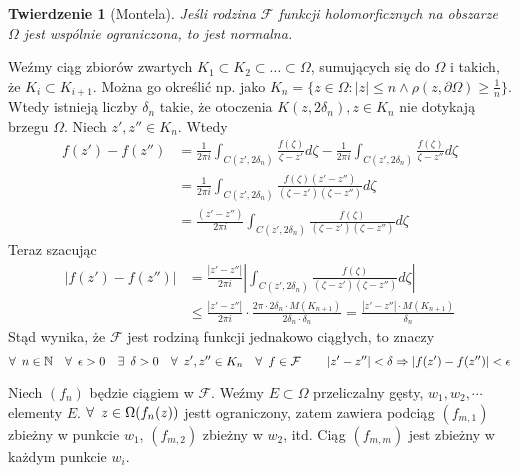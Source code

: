 \documentclass[11pt]{article}
\newcommand{\abs}[1]{\left|#1\right|} %
\theoremstyle{plain}
\newtheorem*{theorem}{Twierdzenie}
\theoremstyle{definition}
\theoremstyle{remark}
\let\oldendproof\endproof
\renewenvironment{proof}[1][\proofname]{
  \oldproof[\textsc{\small #1}]
}{\oldendproof}
\begin{document}
\begin{theorem}[Montela]
  Jeśli rodzina $ \mathcal{F} $ funkcji holomorficznych na obszarze $ \Omega $ jest wspólnie ograniczona, to jest normalna.
\end{theorem}


\begin{proof}
  Weźmy ciąg zbiorów zwartych $ K_1 \subset K_2 \subset \dots \subset \Omega $, sumujących się do $ \Omega $ i takich, że $ K_i \subset K_{i+1} $.
  Można go określić np. jako $ K_n = \{ z \in \Omega: \abs{z} \leq n \wedge \rho(z, \partial\Omega) \geq \frac{1}{n} \} $.
  Wtedy istnieją liczby $ \delta_n $ takie, że otoczenia $ K(z, 2\delta_n), z \in K_n $ nie dotykają brzegu $ \Omega $.
  Niech $ z', z'' \in K_n $.
  Wtedy
  \begin{align*}
    f(z') - f(z'') &
    = \frac{1}{2 \pi i} \int_{C(z', 2\delta_n)} \frac{f(\zeta)}{\zeta-z'} d\zeta - \frac{1}{2 \pi i} \int_{C(z', 2\delta_n)} \frac{f(\zeta)}{\zeta-z''} d\zeta \\ &
    = \frac{1}{2 \pi i} \int_{C(z', 2\delta_n)} \frac{f(\zeta)(z'-z'')}{(\zeta-z')(\zeta-z'')} d\zeta \\ &
    = \frac{(z'-z'')}{2 \pi i} \int_{C(z', 2\delta_n)} \frac{f(\zeta)}{(\zeta-z')(\zeta-z'')} d\zeta
  \end{align*}
  Teraz szacując
  \begin{align*}
    \abs{f(z') - f(z'')} &
    = \frac{\abs{z'-z''}}{2 \pi i} \abs{\int_{C(z', 2\delta_n)} \frac{f(\zeta)}{(\zeta-z')(\zeta-z'')} d\zeta} \\ &
    \leq \frac{\abs{z'-z''}}{2 \pi i} \cdot \frac{2 \pi \cdot 2\delta_n \cdot M(K_{n+1})}{2\delta_n \cdot \delta_n}
    = \frac{\abs{z'-z''} \cdot M(K_{n+1})}{\delta_n}
  \end{align*}
  Stąd wynika, że $ \mathcal{F} $ jest rodziną funkcji jednakowo ciągłych, to znaczy
  $$
    \forall\enskip n \in \mathbb{N} \quad\forall\enskip \epsilon > 0 \quad\exists\enskip \delta > 0 \quad\forall\enskip z',z'' \in K_n \quad\forall\enskip f \in \mathcal{F}
    \qquad \abs{z' - z''} < \delta \Rightarrow \abs{f(z') - f(z'')} < \epsilon
  $$

  Niech $ (f_n) $ będzie ciągiem w $ \mathcal{F} $.
  Weźmy $ E \subset \Omega $ przeliczalny gęsty, $ w_1, w_2, \cdots $ elementy $ E $.
  $ \forall\enskip z \in \Omega (f_n(z)) $ jestt ograniczony, zatem zawiera podciąg $ (f_{m,1}) $ zbieżny w punkcie $ w_1 $, $ (f_{m,2}) $ zbieżny w  $ w_2 $, itd.
  Ciąg $ (f_{m,m}) $ jest zbieżny w każdym punkcie $ w_i $.


\end{proof}
\end{document}
